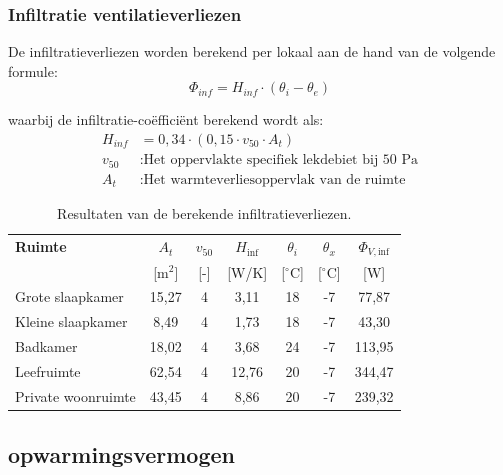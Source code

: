 \documentclass[a4paper,12pt]{article}
\begin{document}
\subsubsection{Infiltratie ventilatieverliezen}
De infiltratieverliezen worden berekend per lokaal aan de hand van de volgende formule:
\begin{equation}
    \Phi_{inf} = H_{inf} \cdot (\theta_{i} - \theta_{e})
\end{equation}

waarbij de infiltratie-coëfficiënt berekend wordt als:
\begin{equation*}
\begin{aligned}
    H_{inf} &= 0,34 \cdot (0,15 \cdot v_{50} \cdot A_t) \\
    v_{50} &: \text{Het oppervlakte specifiek lekdebiet bij 50 } \unit{\pascal} \\
    A_t &: \text{Het warmteverliesoppervlak van de ruimte}
\end{aligned}
\end{equation*}

\begin{table}[!ht]
\centering
\small
\caption{Resultaten van de berekende infiltratieverliezen.}
\label{tab:infiltratieverliezen}
\begin{tabularx}{\textwidth}{X c c c c c c}
\toprule
\rowcolor{gray!20}
\textbf{Ruimte} & \textbf{$A_t$} & \textbf{$v_{50}$} & \textbf{$H_{\text{inf}}$} & \textbf{$\theta_i$} & \textbf{$\theta_x$} & \textbf{$\Phi_{V,\text{inf}}$} \\
\rowcolor{gray!20}
& \scriptsize[m$^2$] & \scriptsize[-] & \scriptsize[W/K] & \scriptsize[$^\circ$C] & \scriptsize[$^\circ$C] & \scriptsize[W] \\ \midrule
Grote slaapkamer & 15,27 & 4 & 3,11 & 18 & -7 & 77,87 \\
Kleine slaapkamer & 8,49 & 4 & 1,73 & 18 & -7 & 43,30 \\
Badkamer & 18,02 & 4 & 3,68 & 24 & -7 & 113,95 \\
Leefruimte & 62,54 & 4 & 12,76 & 20 & -7 & 344,47 \\
Private woonruimte & 43,45 & 4 & 8,86 & 20 & -7 & 239,32 \\ \bottomrule
\end{tabularx}
\end{table}

\subsection{opwarmingsvermogen}
\end{document}

